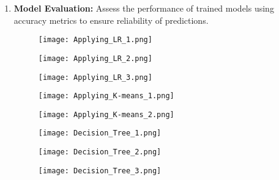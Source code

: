 \documentclass[10pt]{article}
\begin{document}
\begin{enumerate}
    \item \textbf{Model Evaluation:} Assess the performance of trained models using  accuracy metrics to ensure reliability of predictions.
\begin{figure}[H]
\begin{center}
        \texttt{[image: Applying\_LR\_1.png]}
        \label{fig:sub1}
\end{center}
\end{figure}
\begin{figure}[H]
\begin{center}
        \texttt{[image: Applying\_LR\_2.png]}
        \label{fig:sub1}
\end{center}
\end{figure}
\begin{figure}[H]
\begin{center}
        \texttt{[image: Applying\_LR\_3.png]}
        \label{fig:sub1}
\end{center}
\end{figure}
\begin{figure}[H]
\begin{center}
        \texttt{[image: Applying\_K-means\_1.png]}
        \label{fig:sub1}
\end{center}
\end{figure}
\begin{figure}[H]
\begin{center}
        \texttt{[image: Applying\_K-means\_2.png]}
        \label{fig:sub1}
\end{center}
\end{figure}
\begin{figure}[H]
\begin{center}
        \texttt{[image: Decision\_Tree\_1.png]}
        \label{fig:sub1}
\end{center}
\end{figure}
\begin{figure}[H]
\begin{center}
        \texttt{[image: Decision\_Tree\_2.png]}
        \label{fig:sub1}
\end{center}
\end{figure}
\begin{figure}[H]
\begin{center}
        \texttt{[image: Decision\_Tree\_3.png]}
        \label{fig:sub1}
\end{center}
\end{figure}
\end{enumerate}
\end{document}
